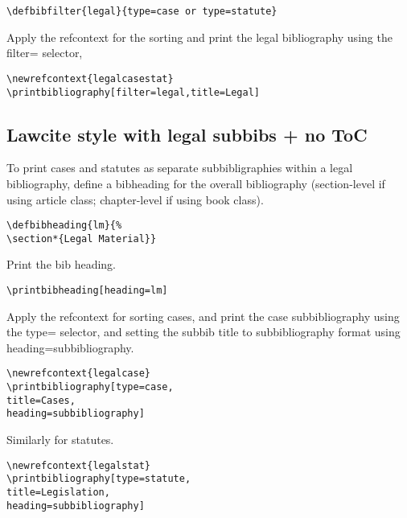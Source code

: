 \documentclass[12pt]{article}
\newcommand\goodoh{{\large\ftmark 🗸}}
\begin{document}
\begin{verbatim}
\defbibfilter{legal}{type=case or type=statute}
\end{verbatim}

Apply the refcontext for the sorting and print the legal bibliography using the filter= selector,

\begin{verbatim}
\newrefcontext{legalcasestat}
\printbibliography[filter=legal,title=Legal]
\end{verbatim}






\subsection{Lawcite style with legal subbibs + no ToC}

To print cases and statutes as separate subbibligraphies within a legal bibliography, define a bibheading for the overall bibliography (section-level if using article class; chapter-level if using book class).


\begin{verbatim}
\defbibheading{lm}{%
\section*{Legal Material}}
\end{verbatim}

Print the bib heading.

\begin{verbatim}
\printbibheading[heading=lm]
\end{verbatim}

Apply the refcontext for sorting cases, and print the case subbibliography using the type= selector, and setting the subbib title to subbibliography format using heading=subbibliography.

\begin{verbatim}
\newrefcontext{legalcase}
\printbibliography[type=case,
title=Cases,
heading=subbibliography]
\end{verbatim}

Similarly for statutes.

\begin{verbatim}
\newrefcontext{legalstat}
\printbibliography[type=statute,
title=Legislation,
heading=subbibliography]
\end{verbatim}
\end{document}
